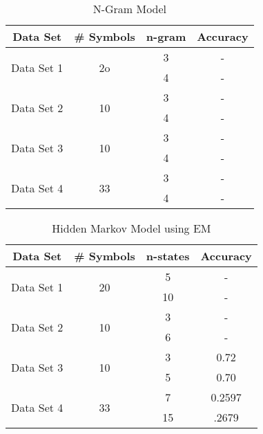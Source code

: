 \documentclass{article} %
\begin{document}
\begin{table}[H]
\caption{N-Gram Model}
\label{N-Gram_model}
\begin{center}
\begin{tabular}{ |c|c|c|c| }
\hline
\multicolumn{1}{|c|}{\bf Data Set} &\multicolumn{1}{|c|}{\bf \# Symbols} &\multicolumn{1}{|c|}{\bf n-gram} &\multicolumn{1}{|c|}{\bf Accuracy}\\
\hline
\multirow{2}{*}{Data Set 1}& \multirow{2}{*}{2o} & 3 & - \\
& & 4 & - \\
\hline
\multirow{2}{*}{Data Set 2}& \multirow{2}{*}{10} & 3 & - \\
& & 4 & - \\
\hline
\multirow{2}{*}{Data Set 3}& \multirow{2}{*}{10} & 3 & - \\
& & 4 & - \\
\hline
\multirow{2}{*}{Data Set 4}& \multirow{2}{*}{33} & 3 & - \\
& & 4 & - \\
\hline
\end{tabular}
\end{center}
\end{table}


\begin{table}[H]
\caption{Hidden Markov Model using EM}
\label{HMM_EM}
\begin{center}
\begin{tabular}{ |c|c|c|c| }
\hline
\multicolumn{1}{|c|}{\bf Data Set} &\multicolumn{1}{|c|}{\bf\# Symbols} &\multicolumn{1}{|c|}{\bf n-states} &\multicolumn{1}{|c|}{\bf Accuracy}\\
\hline
\multirow{2}{*}{Data Set 1}& \multirow{2}{*}{20} & 5 & - \\
& & 10 & - \\
\hline
\multirow{2}{*}{Data Set 2}& \multirow{2}{*}{10} & 3 & - \\
& & 6 & - \\
\hline
\multirow{2}{*}{Data Set 3}& \multirow{2}{*}{10} & 3 & 0.72 \\
& & 5 & 0.70 \\
\hline
\multirow{2}{*}{Data Set 4}& \multirow{2}{*}{33} & 7 & 0.2597 \\
& & 15 & .2679 \\
\hline
\end{tabular}
\end{center}
\end{table}
\end{document}
